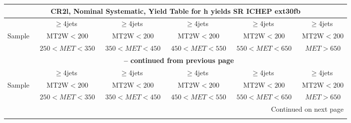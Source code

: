 \documentclass{article}
\begin{document}
 
 
 
 
\begin{longtable}{|l|c|c|c|c|c|} 
 
\multicolumn{6}{c}{ CR2l, Nominal Systematic, Yield Table for h yields SR ICHEP ext30fb }\\* \hline 
  & $\ge$4jets  & $\ge$4jets  & $\ge$4jets  & $\ge$4jets  & $\ge$4jets \\* 
Sample  & ~MT2W$<200$  & ~MT2W$<200$  & ~MT2W$<200$  & ~MT2W$<200$  & ~MT2W$<200$ \\* 
  & ~$250<MET<350$  & ~$350<MET<450$  & ~$450<MET<550$  & ~$550<MET<650$  & ~$MET>650$ \\* 
\hline \hline 
\endfirsthead 
 
\multicolumn{6}{c}{{\bfseries \tablename\ \thetable{} -- continued from previous page}}\\* \hline 
  & $\ge$4jets  & $\ge$4jets  & $\ge$4jets  & $\ge$4jets  & $\ge$4jets \\* 
Sample  & ~MT2W$<200$  & ~MT2W$<200$  & ~MT2W$<200$  & ~MT2W$<200$  & ~MT2W$<200$ \\* 
  & ~$250<MET<350$  & ~$350<MET<450$  & ~$450<MET<550$  & ~$550<MET<650$  & ~$MET>650$ \\* 
\hline \hline 
\endhead 
 
\multicolumn{6}{|r|}{{Continued on next page}}\\* \hline 
\endfoot 
 
 
\endlastfoot 
 

\end{longtable}
\end{document}
